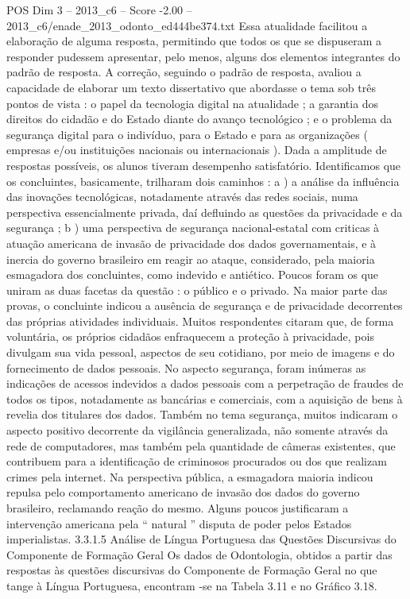 \begin{textsample}{POS Dim 3 – 2013\_c6 – Score -2.00 – 2013\_c6/enade\_2013\_odonto\_ed444be374.txt}
Essa atualidade facilitou a elaboração de alguma resposta, permitindo que todos os que se dispuseram a responder pudessem apresentar, pelo menos, alguns dos elementos integrantes do padrão de resposta.
A correção, seguindo o padrão de resposta, avaliou a capacidade de elaborar um texto dissertativo que abordasse o tema sob três pontos de vista : o papel da tecnologia digital na atualidade ; a garantia dos direitos do cidadão e do Estado diante do avanço tecnológico ; e o problema da segurança digital para o indivíduo, para o Estado e para as organizações ( empresas e/ou instituições nacionais ou internacionais ).
Dada a amplitude de respostas possíveis, os alunos tiveram desempenho satisfatório.
Identificamos que os concluintes, basicamente, trilharam dois caminhos : a ) a análise da influência das inovações tecnológicas, notadamente através das redes sociais, numa perspectiva essencialmente privada, daí defluindo as questões da privacidade e da segurança ; b ) uma perspectiva de segurança nacional-estatal com criticas à atuação americana de invasão de privacidade dos dados governamentais, e à inercia do governo brasileiro em reagir ao ataque, considerado, pela maioria esmagadora dos concluintes, como indevido e antiético.
Poucos foram os que uniram as duas facetas da questão : o público e o privado.
Na maior parte das provas, o concluinte indicou a ausência de segurança e de privacidade decorrentes das próprias atividades individuais.
Muitos respondentes citaram que, de forma voluntária, os próprios cidadãos enfraquecem a proteção à privacidade, pois divulgam sua vida pessoal, aspectos de seu cotidiano, por meio de imagens e do fornecimento de dados pessoais.
No aspecto segurança, foram inúmeras as indicações de acessos indevidos a dados pessoais com a perpetração de fraudes de todos os tipos, notadamente as bancárias e comerciais, com a aquisição de bens à revelia dos titulares dos dados.
Também no tema segurança, muitos indicaram o aspecto positivo decorrente da vigilância generalizada, não somente através da rede de computadores, mas também pela quantidade de câmeras existentes, que contribuem para a identificação de criminosos procurados ou dos que realizam crimes pela internet.
Na perspectiva pública, a esmagadora maioria indicou repulsa pelo comportamento americano de invasão dos dados do governo brasileiro, reclamando reação do mesmo.
Alguns poucos justificaram a intervenção americana pela “ natural ” disputa de poder pelos Estados imperialistas. 3.3.1.5 Análise de Língua Portuguesa das Questões Discursivas do Componente de Formação Geral Os dados de Odontologia, obtidos a partir das respostas às questões discursivas do Componente de Formação Geral no que tange à Língua Portuguesa, encontram -se na Tabela 3.11 e no Gráfico 3.18.

\end{textsample}
